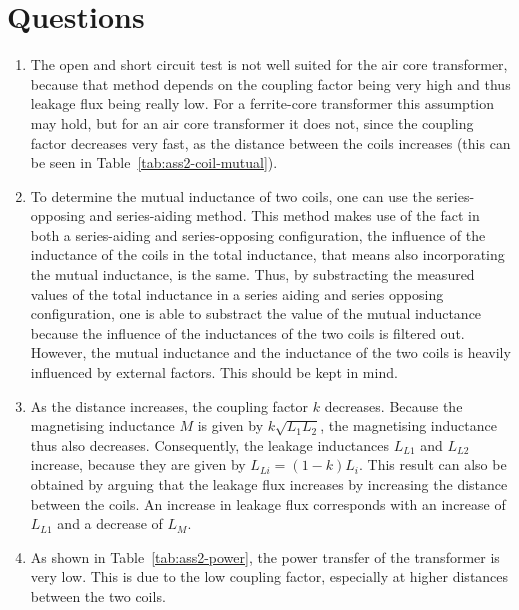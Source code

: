 \documentclass[11pt,titlepage]{report}
\begin{document}
\section{Questions}
\begin{enumerate}
\item
The open and short circuit test is not well suited for the air core transformer, because that method depends on the coupling factor being very high and thus leakage flux being really low. For a ferrite-core transformer this assumption may hold, but for an air core transformer it does not, since the coupling factor decreases very fast, as the distance between the coils increases (this can be seen in Table~\ref{tab:ass2-coil-mutual}).

\item
To determine the mutual inductance of two coils, one can use the series-opposing and series-aiding method. This method makes use of the fact in both a series-aiding and series-opposing configuration, the influence of the inductance of the coils in the total inductance, that means also incorporating the mutual inductance, is the same. Thus, by substracting the measured values of the total inductance in a series aiding and series opposing configuration, one is able to substract the value of the mutual inductance because the influence of the inductances of the two coils is filtered out. However, the mutual inductance and the inductance of the two coils is heavily influenced by external factors. This should be kept in mind. 

\item
As the distance increases, the coupling factor $k$ decreases. Because the magnetising inductance $M$ is given by $k \sqrt{L_1 L_2}$, the magnetising inductance thus also decreases. Consequently, the leakage inductances $L_{L1}$ and $L_{L2}$ increase, because they are given by $L_{Li}=(1-k) L_{i}$. This result can also be obtained by arguing that the leakage flux increases by increasing the distance between the coils. An increase in leakage flux corresponds with an increase of $L_{L1}$ and a decrease of $L_{M}$.

\item
As shown in Table~\ref{tab:ass2-power}, the power transfer of the transformer is very low. This is due to the low coupling factor, especially at higher distances between the two coils.
\end{enumerate}
\end{document}
